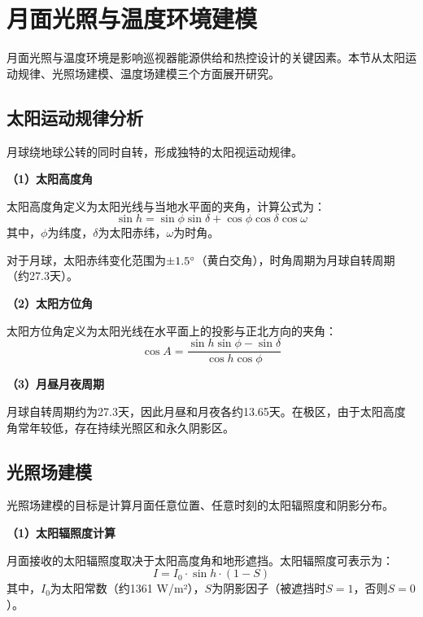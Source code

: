 \section{月面光照与温度环境建模}
\label{sec:light_temp}

月面光照与温度环境是影响巡视器能源供给和热控设计的关键因素。本节从太阳运动规律、光照场建模、温度场建模三个方面展开研究。

\subsection{太阳运动规律分析}
\label{subsec:sun_motion}

月球绕地球公转的同时自转，形成独特的太阳视运动规律。

\textbf{（1）太阳高度角}

太阳高度角定义为太阳光线与当地水平面的夹角，计算公式为：
\begin{equation}
    \sin h = \sin\phi\sin\delta + \cos\phi\cos\delta\cos\omega
    \label{eq:sun_altitude}
\end{equation}
其中，$\phi$为纬度，$\delta$为太阳赤纬，$\omega$为时角。

对于月球，太阳赤纬变化范围为$\pm 1.5\degree$（黄白交角），时角周期为月球自转周期（约27.3天）。

\textbf{（2）太阳方位角}

太阳方位角定义为太阳光线在水平面上的投影与正北方向的夹角：
\begin{equation}
    \cos A = \frac{\sin h \sin\phi - \sin\delta}{\cos h \cos\phi}
    \label{eq:sun_azimuth}
\end{equation}

\textbf{（3）月昼月夜周期}

月球自转周期约为27.3天，因此月昼和月夜各约13.65天。在极区，由于太阳高度角常年较低，存在持续光照区和永久阴影区。

\subsection{光照场建模}
\label{subsec:illumination}

光照场建模的目标是计算月面任意位置、任意时刻的太阳辐照度和阴影分布。

\textbf{（1）太阳辐照度计算}

月面接收的太阳辐照度取决于太阳高度角和地形遮挡。太阳辐照度可表示为：
\begin{equation}
    I = I_0 \cdot \sin h \cdot (1 - S)
    \label{eq:irradiance}
\end{equation}
其中，$I_0$为太阳常数（约1361 W/m²），$S$为阴影因子（被遮挡时$S=1$，否则$S=0$）。

